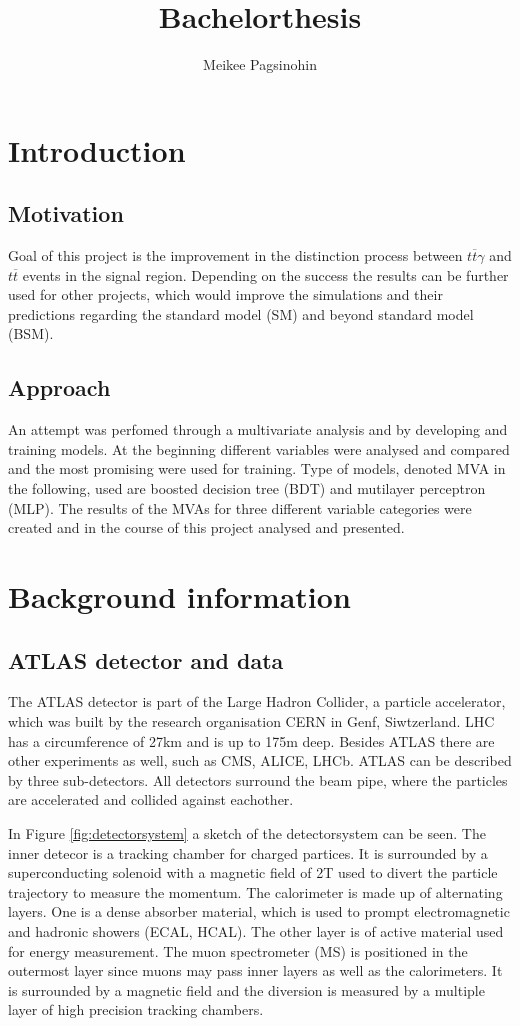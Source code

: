 \documentclass[11pt]{scrartcl}
\title{Bachelorthesis}
\author{Meikee Pagsinohin}
\begin{document}
\section{Introduction}

	\subsection{Motivation}
		Goal of this project is the improvement in the distinction process between $t\overline{t}\gamma$ and $t\overline{t}$ events in the signal region. Depending on the success the results can be further used for other projects, which would improve the simulations and their predictions regarding the standard model (SM) and beyond standard model (BSM). 

	\subsection{Approach}
		An attempt was perfomed through a multivariate analysis and by developing and training models. At the beginning different variables were analysed and compared and the most promising were used for training. Type of models, denoted MVA in the following, used are boosted decision tree (BDT) and mutilayer perceptron (MLP). The results of the MVAs for three different variable categories were created and in the course of this project analysed and presented.

\section{Background information}
	\subsection{ATLAS detector and data}
	The ATLAS detector is part of the Large Hadron Collider, a particle accelerator, which was built by the research organisation CERN in Genf, Siwtzerland. LHC has a circumference of 27km and is up to 175m deep. Besides ATLAS there are other experiments as well, such as CMS, ALICE, LHCb. ATLAS can be described by three sub-detectors. All detectors surround the beam pipe, where the particles are accelerated and collided against eachother.
	
	In Figure \ref{fig:detectorsystem} a sketch of the detectorsystem can be seen. The inner detecor is a tracking chamber for charged partices. It is surrounded by a superconducting solenoid with a magnetic field of 2T used to divert the particle trajectory to measure the momentum. The calorimeter is made up of alternating layers. One is a dense absorber material, which is used to prompt electromagnetic and hadronic showers (ECAL, HCAL). The other layer is of active material used for energy measurement. The muon spectrometer (MS) is positioned in the outermost layer since muons may pass inner layers as well as the calorimeters. It is surrounded by a magnetic field and the diversion is measured by a multiple layer of high precision tracking chambers. 
	
\end{document}
